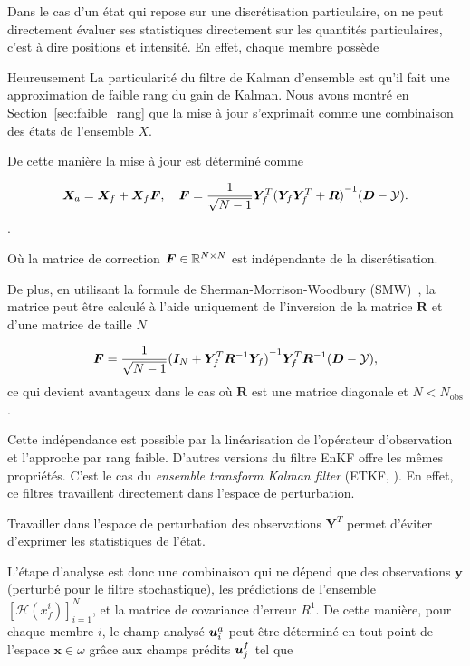 Dans le cas d'un état qui repose sur une discrétisation particulaire, on ne peut directement évaluer ses statistiques directement sur les quantités particulaires, c'est à dire positions et intensité. En effet, chaque membre possède


Heureusement La particularité du filtre de Kalman d'ensemble est qu'il fait une approximation de faible rang du gain de Kalman. Nous avons montré en Section~\ref{sec:faible_rang} que la mise à jour s'exprimait comme une combinaison des états de l'ensemble $X$.

De cette manière la mise à jour est déterminé comme

\begin{equation*}
    \bm{X}_a = \bm{X}_f + \bm{X}_f \bm{F}, \quad \bm{F} = \frac{1}{\sqrt{N-1}} \bm Y_f^T {(\bm Y_f \bm Y_f^T + \bm R)}^{-1}(\bm{D} - \mathcal{Y}).
\end{equation*}.

Où la matrice de correction $\bm{F} \in \mathbb{R}^{N\times N}$ est indépendante de la discrétisation.

De plus, en utilisant la formule de Sherman-Morrison-Woodbury (SMW)~\cite{SMW}, la matrice peut être calculé à l'aide uniquement de l'inversion de la matrice $\bm R$ et d'une matrice de taille $N$

\begin{equation*}
    \bm{F} = \frac{1}{\sqrt{N - 1}} {(\bm I_N + \bm Y_f^T\bm R^{-1}\bm Y_f)}^{-1}\bm Y_f^T \bm R^{-1} (\bm{D} - \mathcal{Y}),
\end{equation*}ce qui devient avantageux dans le cas où $\bm R$ est une matrice diagonale et $N < N_{\text{obs}}$.

Cette indépendance est possible par la linéarisation de l'opérateur d'observation et l'approche par rang faible. D'autres versions du filtre EnKF offre les mêmes propriétés. C'est le cas du \textit{ensemble transform Kalman filter} (ETKF, \cite{Hunt2007}). En effet, ce filtres travaillent directement dans l'espace de perturbation.

Travailler dans l'espace de perturbation des observations $\bm Y^T$ permet d'éviter d'exprimer les statistiques de l'état.

L'étape d'analyse est donc une combinaison qui ne dépend que des observations $\bm y$ (perturbé pour le filtre stochastique), les prédictions de l'ensemble $\left[\mathcal{H}(x^i_f)\right]_{i=1}^{N}$, et la matrice de covariance d'erreur $R^{1}$. De cette manière, pour chaque membre $i$, le champ analysé $\bm{u}_i^a$ peut être déterminé en tout point de l'espace $\bm x \in \omega$ grâce aux champs prédits $\bm{u}_j^f$ tel que


